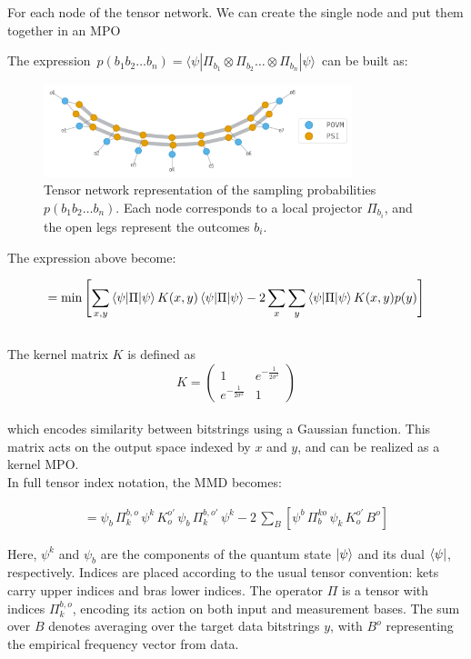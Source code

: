For each node of the tensor network. We can create the single node and put them together in an MPO

The expression $ \, p(b_1b_2\ldots b_n) = \langle\psi|\Pi_{b_1} \otimes \Pi_{b_2} \ldots \otimes \Pi_{b_n}|\psi\rangle \,$
can be built as:
\begin{figure}[h]
    \centering
    \includegraphics[width=0.8\textwidth]{images/new/probs_tn.png}
    \caption{Tensor network representation of the sampling probabilities $p(b_1b_2\ldots b_n)$. Each node corresponds to a local projector $\Pi_{b_i}$, and the open legs represent the outcomes $b_i$.}
    \label{fig:probs_tn}
\end{figure}

The expression above become:

$$
\begin{align*}
= \min \left[
\sum_{x, y} \braket{\psi | \Pi | \psi} K(x, y) \braket{\psi | \Pi | \psi}
- 2 \sum_{x} \sum_{y} \braket{\psi | \Pi | \psi} K(x, y) p(y)
\right]
\end{align*}
$$
\\
The kernel matrix $ K $ is defined as
$$
K = 
\begin{pmatrix}
1 & e^{-\frac{1}{2\sigma^2}} \\
e^{-\frac{1}{2\sigma^2}} & 1
\end{pmatrix}
$$\\
which encodes similarity between bitstrings using a Gaussian function. This matrix acts on the output space indexed by $ x $ and $ y $, and can be realized as a kernel MPO.\\
In full tensor index notation, the MMD becomes:

$$
\begin{aligned}
= \psi_b \, \Pi_k^{b, o} \, \psi^k \, K_{o}^{o'} \, \psi_b \, \Pi_k^{b, o'} \, \psi^k 
- 2\,\sum_B \left[ 
\psi^b \, \Pi_b^{ko} \, \psi_k \, K_{o}^{o'} \, B^o
\right]
\end{aligned}
$$

Here, $ \psi^k $ and $ \psi_b $ are the components of the quantum state $ \ket{\psi} $ and its dual $ \bra{\psi} $, respectively. Indices are placed according to the usual tensor convention: kets carry upper indices and bras lower indices. The operator $ \Pi $ is a tensor with indices $ \Pi_k^{b, o} $, encoding its action on both input and measurement bases. The sum over $ B $ denotes averaging over the target data bitstrings $ y $, with $ B^o $ representing the empirical frequency vector from data.

